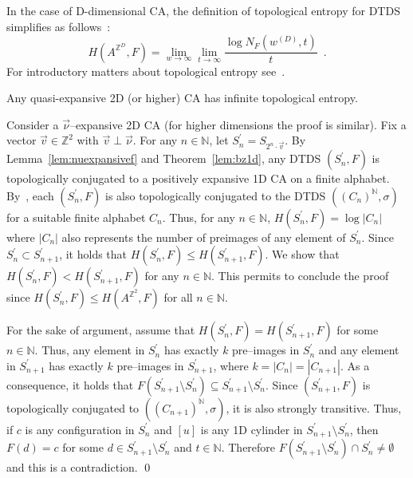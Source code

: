 \documentclass{llncs}
\newcommand{\n}{\ensuremath{\mathbb{N}}\xspace}
\newcommand{\azd}{\ensuremath{A^{\mathbb{Z}^D}}\xspace}
\newcommand{\zdu}{\ensuremath{\mathbb{Z}^2}\xspace}
\newcommand{\azdu}{\ensuremath{A^{\zdu}}\xspace}
\newcommand{\para}[1]{(#1)}
\newcommand{\nn}{\vec\nu}
\newcommand{\vv}{\vec v}
\begin{document}
In the case of D-dimensional CA, the definition of topological entropy for DTDS simplifies as follows~\cite{hurd92,damico03}:
\[
H(\azd,F)=\lim_{w\to\infty}\lim_{t\to\infty}\frac{\log N_F(w^{(D)},t)}{t}
\enspace.
\]
For introductory matters about topological entropy see~\cite{kurka04}.

\begin{theorem}\label{th:qe-infinite-tope}
Any quasi-expansive 2D (or higher) CA has infinite topological
entropy.
\end{theorem}
\proof
Consider a $\nn$--expansive 2D CA (for higher dimensions the proof is similar).
Fix a vector $\vv\in\zdu$ with $\vv\perp\nn$. For any $n\in\n$, let $S^\prime_n=S_{2^n\cdot\vv}$. 
By Lemma~\ref{lem:nuexpansivef} and Theorem~\ref{lem:bz1d}, any DTDS $\para{S^\prime_n, F}$ is topologically conjugated to a positively expansive 1D CA on a finite alphabet. 
By~\cite[Thm. 3.12]{nasu95}, each $\para{S^\prime_n, F}$ is also topologically conjugated to the DTDS $\para{(C_n)^\n,\sigma}$ for a suitable finite alphabet $C_n$. Thus, for any $n\in\n$, $H(S^\prime_n,F)=\log |C_n|$ where $|C_n|$ also represents the number of preimages of any element of $S^\prime_n$.
Since $S^\prime_n\subset S^\prime_{n+1}$, it holds that $H(S^\prime_n,F)\leq H(S^\prime_{n+1}, F)$. We show that $H(S^\prime_n,F)< H(S^\prime_{n+1}, F)$ for any $n\in\n$. This permits to conclude the proof since $H(S^\prime_n,F)\leq H(\azdu,F)$ for all $n\in\n$. 

For the sake of argument, assume that $H(S^\prime_n,F)= H(S^\prime_{n+1}, F)$ for some $n\in\n$. Thus, any element in $S^\prime_n$ has exactly $k$ pre--images in $S^\prime_n$ and any element in $S^\prime_{n+1}$ has exactly $k$ pre--images in $S^\prime_{n+1}$, where $k=|C_n|=|C_{n+1}|$. As a consequence, it holds that $F(S^\prime_{n+1}\setminus S^\prime_{n}) \subseteq S^\prime_{n+1}\setminus S^\prime_{n}$.  Since $\para{S^\prime_{n+1},F}$ is topologically conjugated to $\para{(C_{n+1})^\n,\sigma}$, it is also strongly transitive. 
Thus, if $c$ is any configuration in $S^\prime_n$ and $[u]$ is any 1D cylinder in $S^\prime_{n+1}\setminus S^\prime_{n}$, then $F(d)=c$ for some $d\in S^\prime_{n+1}\setminus S^\prime_{n}$ and $t\in\n$. Therefore $F(S^\prime_{n+1}\setminus S^\prime_{n})\cap S^\prime_{n}\neq \emptyset$ and this is a contradiction. 
\qed
\end{document}
